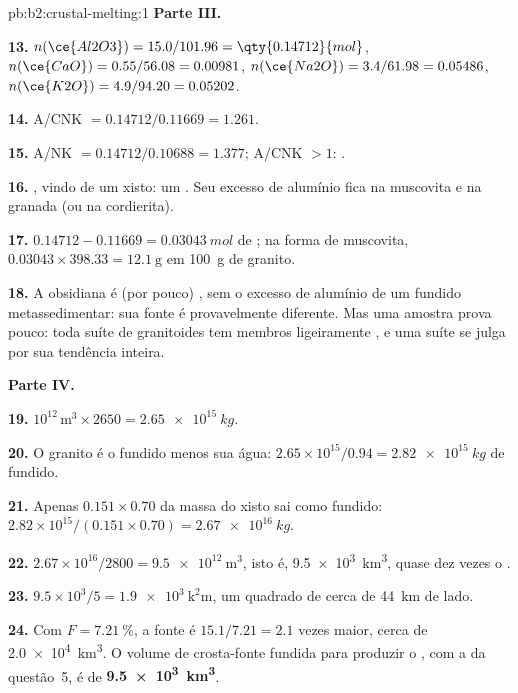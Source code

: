 \begin{solution}{pb:b2:crustal-melting:1}
\noindent\textbf{Parte III.}

\textbf{13.} $n(\ce{Al2O3}) = 15.0/101.96 = \qty{0.14712}{mol}$, $n(\ce{CaO}) =
0.55/56.08 = 0.00981$, $n(\ce{Na2O}) = 3.4/61.98 = 0.05486$, $n(\ce{K2O}) = 4.9/94.20 =
0.05202$.

\textbf{14.} A/CNK $= 0.14712/0.11669 = 1.261$.

\textbf{15.} A/NK $= 0.14712/0.10688 = 1.377$; A/CNK $> 1$: .

\textbf{16.} , vindo de um xisto: um . Seu excesso de alumínio fica na
muscovita e na granada (ou na cordierita).

\textbf{17.} $0.14712 - 0.11669 = \qty{0.03043}{mol}$ de ; na forma de muscovita,
$0.03043\times398.33 = \qty{12.1}{\gram}$ em \qty{100}{\gram} de granito.

\textbf{18.} A obsidiana é (por pouco) , sem o excesso de alumínio de um
fundido metassedimentar: sua fonte é provavelmente diferente. Mas uma amostra prova pouco:
toda suíte de granitoides tem membros ligeiramente , e uma suíte se julga por sua
tendência inteira.

\noindent\textbf{Parte IV.}

\textbf{19.} $10^{12}\,\unit{\cubic\metre}\times2650 = \qty{2.65e15}{kg}$.

\textbf{20.} O granito é o fundido menos sua água: $2.65\times10^{15}/0.94 =
\qty{2.82e15}{kg}$ de fundido.

\textbf{21.} Apenas $0.151\times0.70$ da massa do xisto sai como fundido:
$2.82\times10^{15}/(0.151\times0.70) = \qty{2.67e16}{kg}$.

\textbf{22.} $2.67\times10^{16}/2800 = \qty{9.5e12}{\cubic\metre}$, isto é,
\qty{9.5e3}{\cubic\kilo\metre}, quase dez vezes o .

\textbf{23.} $9.5\times10^3/5 = \qty{1.9e3}{\square\kilo\metre}$, um quadrado de cerca de
\qty{44}{km} de lado.

\textbf{24.} Com $F = \qty{7.21}{\percent}$, a fonte é $15.1/7.21 = 2.1$ vezes
maior, cerca de \qty{2.0e4}{\cubic\kilo\metre}. O volume de crosta-fonte fundida para produzir
o , com a  da questão~5, é de
\textbf{\qty[text-series-to-math=true]{9.5e3}{\cubic\kilo\metre}}.
\end{solution}
